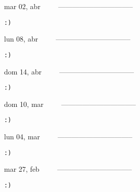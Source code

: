 \documentclass[letterpaper,10pt]{article}
\begin{document}
\begin{multicols}{3}
{mar 02, abr\ \ \ \ \ --------------------------------}
\begin{flushright}\begin{small}\texttt{:)}\end{small}\end{flushright}
\vfill
{lun 08, abr\ \ \ \ \ --------------------------------}
\begin{flushright}\begin{small}\texttt{:)}\end{small}\end{flushright}\par
\vfill
{dom 14, abr\ \ \ \ \ --------------------------------}
\begin{flushright}\begin{small}\texttt{:)}\end{small}\end{flushright}\par
\vfill
\end{multicols}
\vspace{1.05cm}

\begin{multicols}{3}
{dom 10, mar\ \ \ \ \ --------------------------------}
\begin{flushright}\begin{small}\texttt{:)}\end{small}\end{flushright}
\vfill
{lun 04, mar\ \ \ \ \ --------------------------------}
\begin{flushright}\begin{small}\texttt{:)}\end{small}\end{flushright}\par
\vfill
{mar 27, feb\ \ \ \ \ --------------------------------}
\begin{flushright}\begin{small}\texttt{:)}\end{small}\end{flushright}\par
\vfill
\end{multicols}
\vspace{1.05cm}
\end{document}
